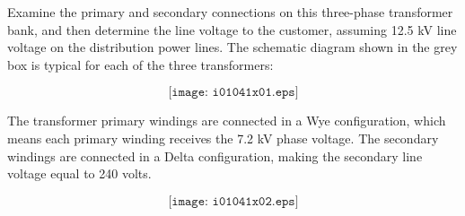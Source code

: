 

Examine the primary and secondary connections on this three-phase transformer bank, and then determine the line voltage to the customer, assuming 12.5 kV line voltage on the distribution power lines.  The schematic diagram shown in the grey box is typical for each of the three transformers:

$$\texttt{[image: i01041x01.eps]}$$







The transformer primary windings are connected in a Wye configuration, which means each primary winding receives the 7.2 kV phase voltage.  The secondary windings are connected in a Delta configuration, making the secondary line voltage equal to 240 volts.

$$\texttt{[image: i01041x02.eps]}$$












